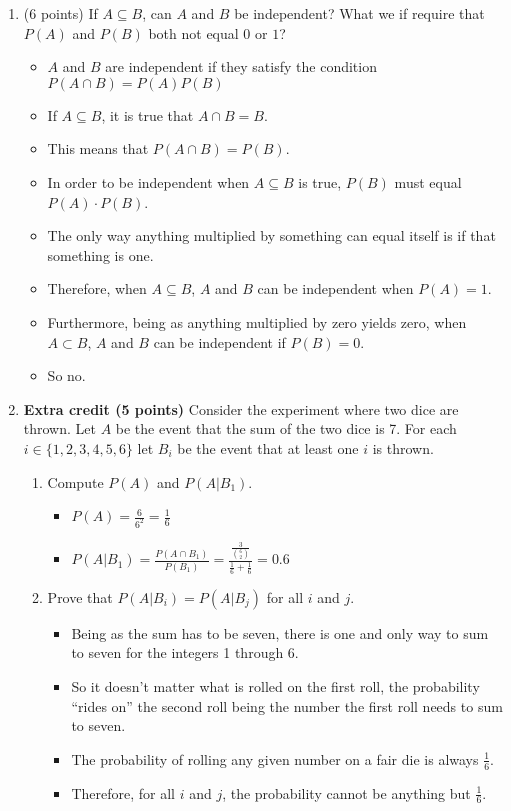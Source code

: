 \documentclass[11pt]{article}
\begin{document}
\begin{enumerate}
\item (6 points) If $A \subseteq B$, can $A$ and $B$ be independent?  What we
if require that $P(A)$ and $P(B)$ both not equal $0$ or $1$?

\begin{itemize}

\item $A$ and $B$ are independent if they satisfy the condition $P(A \cap B) = P(A)P(B)$
\item If $A \subseteq B$, it is true that $A \cap B = B$.
\item This means that $P(A \cap B)=P(B)$.
\item In order to be independent when $A \subseteq B$ is true, $P(B)$ must equal $P(A)\cdot P(B)$.
\item The only way anything multiplied by something can equal itself is if that something is one.
\item Therefore, when $A \subseteq B$, $A$ and $B$ can be independent when $P(A) = 1$.
\item Furthermore, being as anything multiplied by zero yields zero, when $A \subset B$, $A$ and $B$ can be independent if $P(B) = 0$.
\item So no.

\end{itemize}

\item \textbf{Extra credit (5 points)}  Consider the experiment where two dice
are thrown. Let $A$ be the event that the sum of the two dice is 7. For each 
$i \in \{1,2,3,4,5,6\}$  let $B_i$ be the event that at least one $i$ is thrown.
\begin{enumerate}
\item Compute $P(A)$ and $P(A|B_1)$.

\begin{itemize}

\item $P(A) = \frac{6}{6^2} = \frac{1}{6}$
\item $P(A|B_1) = \frac{P(A \cap B_1)}{P(B_1)}= \frac{\frac{3}{{6 \choose 2}}}{\frac{1}{6} + \frac{1}{6}} = 0.6$

\end{itemize}

\item Prove that $P(A|B_i) = P(A|B_j)$ for all $i$ and $j$.
\begin{itemize}
\item Being as the sum has to be seven, there is one and only way to sum to seven for the integers 1 through 6.
\item So it doesn't matter what is rolled on the first roll, the probability ``rides on'' the second roll being the number the first roll needs to sum to seven.
\item The probability of rolling any given number on a fair die is always $\frac{1}{6}$.
\item Therefore, for all $i$ and $j$, the probability cannot be anything but $\frac{1}{6}$.
\end{itemize}


\end{enumerate}
\end{enumerate}
\end{document}
